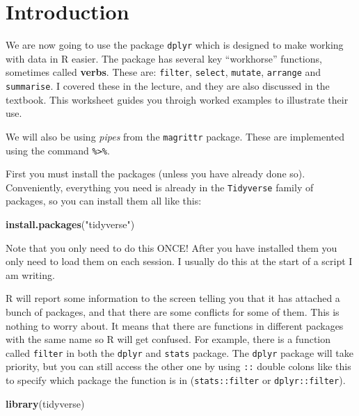 \documentclass[
  a4paperpaper,
]{book}
\newenvironment{Shaded}{\begin{snugshade}}{\end{snugshade}}
\newcommand{\KeywordTok}[1]{\textcolor[rgb]{0.13,0.29,0.53}{\textbf{#1}}}
\newcommand{\NormalTok}[1]{#1}
\newcommand{\StringTok}[1]{\textcolor[rgb]{0.31,0.60,0.02}{#1}}
\begin{document}
\hypertarget{introduction}{%
\section{Introduction}\label{introduction}}

We are now going to use the package \texttt{dplyr} which is designed to make working with data in R easier.
The package has several key ``workhorse'' functions, sometimes called \textbf{verbs}. These are: \texttt{filter}, \texttt{select}, \texttt{mutate}, \texttt{arrange} and \texttt{summarise}. I covered these in the lecture, and they are also discussed in the textbook. This worksheet guides you throigh worked examples to illustrate their use.

We will also be using \emph{pipes} from the \texttt{magrittr} package. These are implemented using the command \texttt{\%\textgreater{}\%}.

First you must install the packages (unless you have already done so). Conveniently, everything you need is already in the \texttt{Tidyverse} family of packages, so you can install them all like this:

\begin{Shaded}
\begin{Highlighting}[]
\KeywordTok{install.packages}\NormalTok{(}\StringTok{"tidyverse"}\NormalTok{)}
\end{Highlighting}
\end{Shaded}

Note that you only need to do this ONCE! After you have installed them you only need to load them on each session. I usually do this at the start of a script I am writing.

R will report some information to the screen telling you that it has attached a bunch of packages, and that there are some conflicts for some of them. This is nothing to worry about. It means that there are functions in different packages with the same name so R will get confused. For example, there is a function called \texttt{filter} in both the \texttt{dplyr} and \texttt{stats} package. The \texttt{dplyr} package will take priority, but you can still access the other one by using \texttt{::} double colons like this to specify which package the function is in (\texttt{stats::filter} or \texttt{dplyr::filter}).

\begin{Shaded}
\begin{Highlighting}[]
\KeywordTok{library}\NormalTok{(tidyverse)}
\end{Highlighting}
\end{Shaded}
\end{document}
